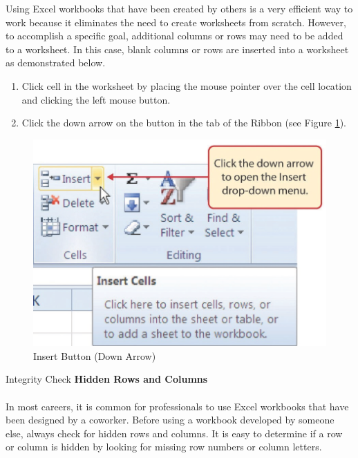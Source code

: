 Using Excel workbooks that have been created by others is a very efficient way to work because it eliminates the need to create worksheets from scratch. However, to accomplish a specific goal, additional columns or rows may need to be added to a worksheet. In this case, blank columns or rows are inserted into a worksheet as demonstrated below.

\begin{enumerate}
	\item Click cell  in the  worksheet by placing the mouse pointer over the cell location and clicking the left mouse button.
	\item Click the down arrow on the  button in the  tab of the Ribbon (see Figure \ref{01:fig28}).
\end{enumerate}

\begin{figure}[H]
	\centering
	\includegraphics[width=\maxwidth{.95\linewidth}]{gfx/ch01_fig28}
	\caption{Insert Button (Down Arrow)}
	\label{01:fig28}
\end{figure}

\begin{center}
	\begin{infobox}{Integrity Check}
		\textbf{Hidden Rows and Columns}
		\\
		\\
		In most careers, it is common for professionals to use Excel workbooks that have been designed by a coworker. Before using a workbook developed by someone else, always check for hidden rows and columns. It is easy to determine if a row or column is hidden by looking for missing row  numbers or column letters.
	\end{infobox}
\end{center}

